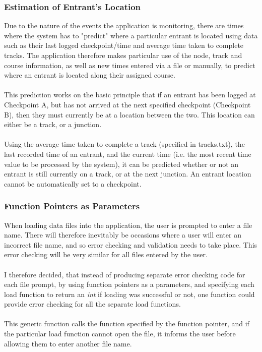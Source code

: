 \documentclass[12pt]{article}
\begin{document}
\subsubsection{Estimation of Entrant's Location}

Due to the nature of the events the application is monitoring, there are times where the system has to "predict" where a particular entrant is located using data such as their last logged checkpoint/time and average time taken to complete tracks. The application therefore makes particular use of the node, track and course information, as well as new times entered via a file or manually, to predict where an entrant is located along their assigned course. \\\\
This prediction works on the basic principle that if an entrant has been logged at Checkpoint A, but has not arrived at the next specified checkpoint (Checkpoint B), then they must currently be at a location between the two. This location can either be a track, or a junction.\\\\ 
Using the average time taken to complete a track (specified in tracks.txt), the last recorded time of an entrant, and the current time (i.e. the most recent time value to be processed by the system), it can be predicted whether or not an entrant is still currently on a track, or at the next junction. An entrant location cannot be automatically set to a checkpoint.

\subsubsection{Function Pointers as Parameters}

When loading data files into the application, the user is prompted to enter a file name. There will therefore inevitably be occasions where a user will enter an incorrect file name, and so error checking and validation needs to take place. This error checking will be very similar for all files entered by the user.\\\\
I therefore decided, that instead of producing separate error checking code for each file prompt, by using function pointers as a parameters, and specifying each load function to return an \textit{int} if loading was successful or not, one function could provide error checking for all the separate load functions. \\\\
This generic function calls the function specified by the function pointer, and if the particular load function cannot open the file, it informs the user before allowing them to enter another file name.
\end{document}
